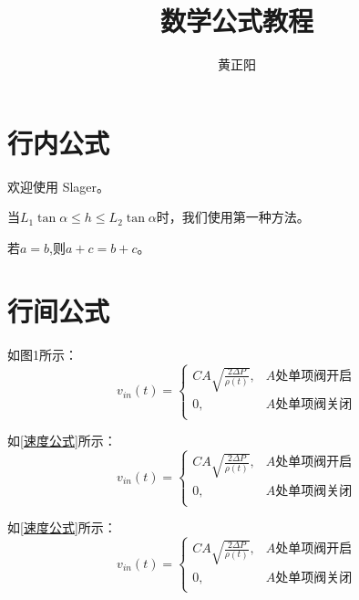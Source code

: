 \documentclass[12pt]{article}
\title{\textbf{数学公式教程}}
\author{黄正阳}
\begin{document}
	
	\maketitle
	
	\tableofcontents
	
	\section{行内公式}
	欢迎使用 Slager。
	
	当$L_1\tan \alpha \le h \le L_2\tan \alpha$时，我们使用第一种方法。
	
	若$a=b$,则$a+c=b+c$。
	
	\section{行间公式}
	如图1所示：
	\begin{equation} %
		v_{in}(t) =
		\begin{cases}
			CA\sqrt{\frac{2\varDelta P}{\rho(t)}}, & A\text{处单项阀开启}\\
			0, & A\text{处单项阀关闭}\\
		\end{cases} 
	\end{equation}
	
	如\ref{速度公式}所示：
	\begin{equation} %
		v_{in}(t) =
		\begin{cases}
			CA\sqrt{\frac{2\varDelta P}{\rho(t)}}, & A\text{处单项阀开启}\\
			0, & A\text{处单项阀关闭}\\
		\end{cases} 
		\label{速度公式}
		\tag{公式1}
	\end{equation}
	
	如\eqref{速度公式}所示：
	\begin{equation} %
		v_{in}(t) =
		\begin{cases}
			CA\sqrt{\frac{2\varDelta P}{\rho(t)}}, & A\text{处单项阀开启}\\
			0, & A\text{处单项阀关闭}\\
		\end{cases} 
		\label{速度公式}
		\tag{公式1}
	\end{equation}
	
\end{document}
